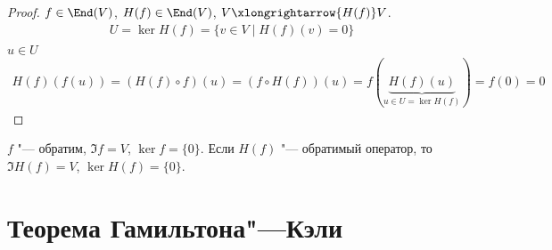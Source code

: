\begin{proof}
	$f \in \End (V)$, $H(f) \in \End(V)$, $V \xlongrightarrow{H(f)} V$.
	\begin{gather*}
		U = \ker H(f) = \{v \in V \mid H(f)(v) = 0\} \\
	\end{gather*}
	$u \in U$
	\begin{gather*}
		H(f)(f(u)) = (H(f) \circ f)(u) = (f \circ H(f))(u) = f (\underbrace{H(f)(u)}_{u \in U = \ker H(f)}) = f(0) = 0
	\end{gather*}
\end{proof}

\begin{Rem}
	$f$ "--- обратим, $\Im f = V$, $\ker f = \{0\}$.
	Если $H(f)$ "--- обратимый оператор, то $\Im H(f) = V$, $\ker H(f) = \{0\}$.
\end{Rem}

\section{Теорема Гамильтона"---Кэли}

